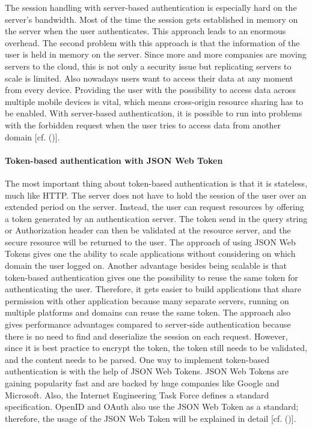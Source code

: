 {The session handling with server-based authentication is especially hard on the server’s bandwidth. Most of the time the session gets established in memory on the server when the user authenticates. This approach leads to an enormous overhead. The second problem with this approach is that the information of the user is held in memory on the server. Since more and more companies are moving servers to the cloud, this is not only a security issue but replicating servers to scale is limited. Also nowadays users want to access their data at any moment from every device. Providing the user with the possibility to access data across multiple mobile devices is vital, which means cross-origin resource sharing has to be enabled. With server-based authentication, it is possible to run into problems with the forbidden request when the user tries to access data from another domain [cf. (\cite{Serilleja:2015:Scothio})].


\paragraph{
	Token-based authentication with JSON Web Token
}

The most important thing about token-based authentication is that it is stateless, much like HTTP. The server does not have to hold the session of the user over an extended period on the server. Instead, the user can request resources by offering a token generated by an authentication server. The token send in the query string or Authorization header can then be validated at the resource server, and the secure resource will be returned to the user. The approach of using JSON Web Tokens gives one the ability to scale applications without considering on which domain the user logged on. Another advantage besides being scalable is that token-based authentication gives one the possibility to reuse the same token for authenticating the user. Therefore, it gets easier to build applications that share permission with other application because many separate servers, running on multiple platforms and domains can reuse the same token. The approach also gives performance advantages compared to server-side authentication because there is no need to find and deserialize the session on each request. However, since it is best practice to encrypt the token, the token still needs to be validated, and the content needs to be parsed. One way to implement token-based authentication is with the help of JSON Web Tokens. JSON Web Tokens are gaining popularity fast and are backed by huge companies like Google and Microsoft. Also, the Internet Engineering Task Force defines a standard specification. OpenID and OAuth also use the JSON Web Token as a standard; therefore, the usage of the JSON Web Token will be explained in detail [cf. (\cite{Tkalec:2015})].


}
